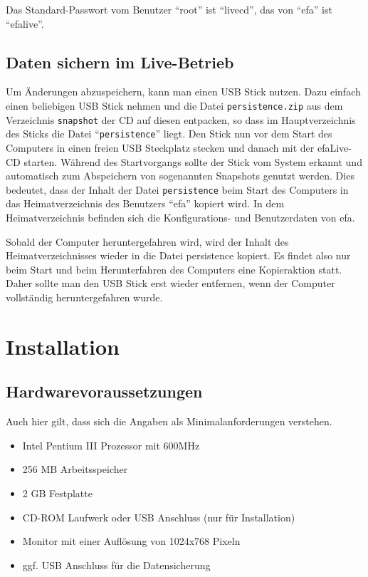 \documentclass[a4paper,12pt,twoside]{article}
\begin{document}
Das Standard-Passwort vom Benutzer "`root"' ist "`livecd"', das von
"`efa"' ist "`efalive"'.


\subsection{Daten sichern im Live-Betrieb}
\label{sct:live_sichern}
Um Änderungen abzuspeichern, kann man einen USB Stick nutzen. Dazu
einfach einen beliebigen USB Stick nehmen und die Datei \texttt{persistence.zip}
aus dem Verzeichnis \texttt{snapshot} der CD auf diesen entpacken, so dass im
Hauptverzeichnis des Sticks die Datei "`\texttt{persistence}"' liegt. Den Stick nun
vor dem Start des Computers in einen freien USB Steckplatz stecken und
danach mit der efaLive-CD starten. Während des Startvorgangs sollte der
Stick vom System erkannt und automatisch zum Abspeichern von
sogenannten Snapshots genutzt werden. Dies bedeutet, dass der Inhalt
der Datei \texttt{persistence} beim Start des Computers in das Heimatverzeichnis
des Benutzers "`efa"' kopiert wird. In dem
Heimatverzeichnis befinden sich die Konfigurations- und Benutzerdaten
von efa.

Sobald der Computer heruntergefahren wird, wird der Inhalt des
Heimatverzeichnisses wieder in die Datei persistence kopiert. Es findet
also nur beim Start und beim Herunterfahren des Computers eine
Kopieraktion statt. Daher sollte man den USB Stick erst wieder
entfernen, wenn der Computer vollständig heruntergefahren wurde.


\section{Installation}
\label{sct:installation}
\subsection{Hardwarevoraussetzungen}
\label{sct:inst_hardware}
Auch hier gilt, dass sich die Angaben als Minimalanforderungen
verstehen.

\begin{itemize}
    \item Intel Pentium III Prozessor mit 600MHz
    \item 256 MB Arbeitsspeicher
    \item 2 GB Festplatte
    \item CD-ROM Laufwerk oder USB Anschluss (nur für Installation)
    \item Monitor mit einer Auflösung von 1024x768 Pixeln
    \item ggf. USB Anschluss für die Datensicherung
\end{itemize}
\end{document}
